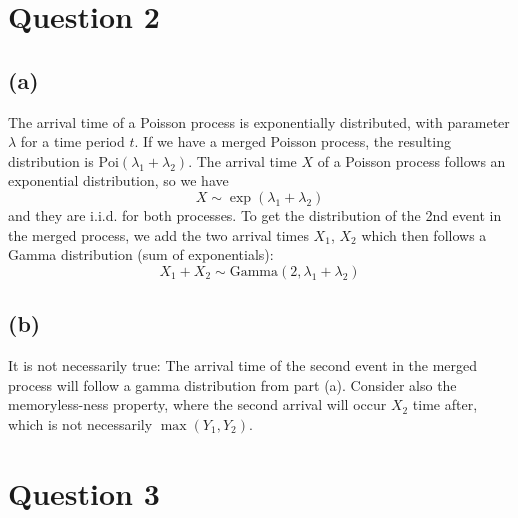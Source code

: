 \documentclass[12pt]{article}
\begin{document}
\newpage

\section*{Question 2}

\subsection*{(a)}
The arrival time of a Poisson process is exponentially distributed, with parameter $\lambda$ for a time period $t$. If we have a merged Poisson process, the resulting distribution is $\text{Poi}(\lambda_1 + \lambda_2)$. The arrival time $X$ of a Poisson process follows an exponential distribution, so we have \begin{equation*}
    X \sim \exp (\lambda_1 + \lambda_2)
\end{equation*} and they are i.i.d. for both processes. To get the distribution of the 2nd event in the merged process, we add the two arrival times $X_{1}$, $X_{2}$ which then follows a Gamma distribution (sum of exponentials): \begin{equation*}
    X_{1} + X_{2} \sim \text{Gamma}(2, \lambda_1 + \lambda_2)
\end{equation*}

\subsection*{(b)}

It is not necessarily true: The arrival time of the second event in the merged process will follow a gamma distribution from part (a). Consider also the memoryless-ness property, where the second arrival will occur $X_{2}$ time after, which is not necessarily $\max (Y_{1}, Y_{2})$.

\newpage 

\section*{Question 3}
\end{document}

